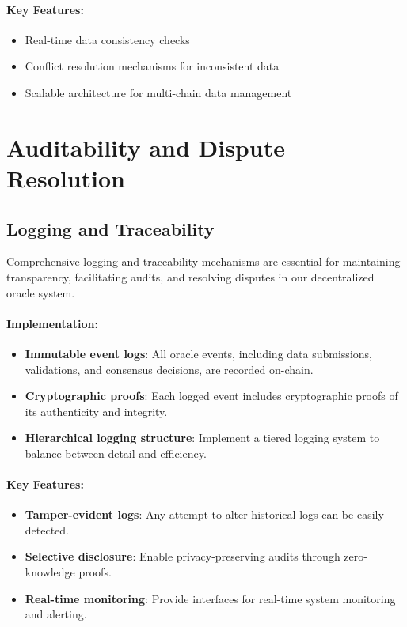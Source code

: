 \documentclass[12pt,a4paper]{article}
\begin{document}
	\paragraph{Key Features:}
	\begin{itemize}
		\item Real-time data consistency checks
		\item Conflict resolution mechanisms for inconsistent data
		\item Scalable architecture for multi-chain data management
	\end{itemize}
	
	\section{Auditability and Dispute Resolution}
	
	\subsection{Logging and Traceability}
	Comprehensive logging and traceability mechanisms are essential for maintaining transparency, facilitating audits, and resolving disputes in our decentralized oracle system.
	
	\paragraph{Implementation:}
	\begin{itemize}
		\item \textbf{Immutable event logs}: All oracle events, including data submissions, validations, and consensus decisions, are recorded on-chain.
		\item \textbf{Cryptographic proofs}: Each logged event includes cryptographic proofs of its authenticity and integrity.
		\item \textbf{Hierarchical logging structure}: Implement a tiered logging system to balance between detail and efficiency.
	\end{itemize}
	
	\paragraph{Key Features:}
	\begin{itemize}
		\item \textbf{Tamper-evident logs}: Any attempt to alter historical logs can be easily detected.
		\item \textbf{Selective disclosure}: Enable privacy-preserving audits through zero-knowledge proofs.
		\item \textbf{Real-time monitoring}: Provide interfaces for real-time system monitoring and alerting.
	\end{itemize}
	
\end{document}
